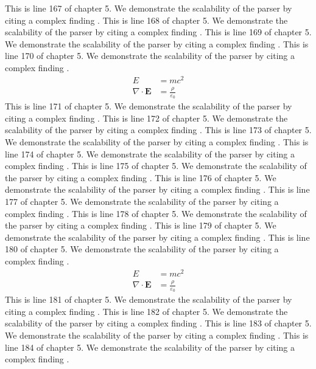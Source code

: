 This is line 167 of chapter 5. We demonstrate the scalability of the parser by citing a complex finding \cite{ref5_167}.
This is line 168 of chapter 5. We demonstrate the scalability of the parser by citing a complex finding \cite{ref5_168}.
This is line 169 of chapter 5. We demonstrate the scalability of the parser by citing a complex finding \cite{ref5_169}.
This is line 170 of chapter 5. We demonstrate the scalability of the parser by citing a complex finding \cite{ref5_170}.
\begin{align*}
  E &= mc^2 \\
  \nabla \cdot \mathbf{E} &= \frac{\rho}{\varepsilon_0}
\end{align*}
This is line 171 of chapter 5. We demonstrate the scalability of the parser by citing a complex finding \cite{ref5_171}.
This is line 172 of chapter 5. We demonstrate the scalability of the parser by citing a complex finding \cite{ref5_172}.
This is line 173 of chapter 5. We demonstrate the scalability of the parser by citing a complex finding \cite{ref5_173}.
This is line 174 of chapter 5. We demonstrate the scalability of the parser by citing a complex finding \cite{ref5_174}.
This is line 175 of chapter 5. We demonstrate the scalability of the parser by citing a complex finding \cite{ref5_175}.
This is line 176 of chapter 5. We demonstrate the scalability of the parser by citing a complex finding \cite{ref5_176}.
This is line 177 of chapter 5. We demonstrate the scalability of the parser by citing a complex finding \cite{ref5_177}.
This is line 178 of chapter 5. We demonstrate the scalability of the parser by citing a complex finding \cite{ref5_178}.
This is line 179 of chapter 5. We demonstrate the scalability of the parser by citing a complex finding \cite{ref5_179}.
This is line 180 of chapter 5. We demonstrate the scalability of the parser by citing a complex finding \cite{ref5_180}.
\begin{align*}
  E &= mc^2 \\
  \nabla \cdot \mathbf{E} &= \frac{\rho}{\varepsilon_0}
\end{align*}
This is line 181 of chapter 5. We demonstrate the scalability of the parser by citing a complex finding \cite{ref5_181}.
This is line 182 of chapter 5. We demonstrate the scalability of the parser by citing a complex finding \cite{ref5_182}.
This is line 183 of chapter 5. We demonstrate the scalability of the parser by citing a complex finding \cite{ref5_183}.
This is line 184 of chapter 5. We demonstrate the scalability of the parser by citing a complex finding \cite{ref5_184}.

